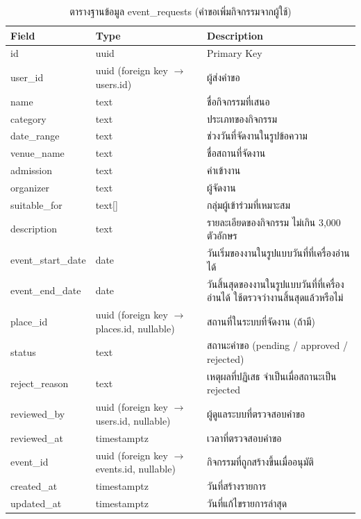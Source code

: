 \begin{table}[H]
\centering
\caption{ตารางฐานข้อมูล event\_requests (คำขอเพิ่มกิจกรรมจากผู้ใช้)}
\label{tab:db_eventrequests}
\begin{tabular}{|p{3.6cm}|p{2.6cm}|p{6.8cm}|}
\hline
\textbf{Field} & \textbf{Type} & \textbf{Description} \\
\hline
id & uuid & Primary Key \\ \hline
user\_id & uuid (foreign key $\to$ users.id) & ผู้ส่งคำขอ \\ \hline
name & text & ชื่อกิจกรรมที่เสนอ \\ \hline
category & text & ประเภทของกิจกรรม \\ \hline
date\_range & text & ช่วงวันที่จัดงานในรูปข้อความ \\ \hline
venue\_name & text & ชื่อสถานที่จัดงาน \\ \hline
admission & text & ค่าเข้างาน \\ \hline
organizer & text & ผู้จัดงาน \\ \hline
suitable\_for & text[] & กลุ่มผู้เข้าร่วมที่เหมาะสม \\ \hline
description & text & รายละเอียดของกิจกรรม ไม่เกิน 3,000 ตัวอักษร \\ \hline
event\_start\_date & date & วันเริ่มของงานในรูปแบบวันที่ที่เครื่องอ่านได้ \\ \hline
event\_end\_date & date & วันสิ้นสุดของงานในรูปแบบวันที่ที่เครื่องอ่านได้ ใช้ตรวจว่างานสิ้นสุดแล้วหรือไม่ \\ \hline
place\_id & uuid (foreign key $\to$ places.id, nullable) & สถานที่ในระบบที่จัดงาน (ถ้ามี) \\ \hline
status & text & สถานะคำขอ (pending / approved / rejected) \\ \hline
reject\_reason & text & เหตุผลที่ปฏิเสธ จำเป็นเมื่อสถานะเป็น rejected \\ \hline
reviewed\_by & uuid (foreign key $\to$ users.id, nullable) & ผู้ดูแลระบบที่ตรวจสอบคำขอ \\ \hline
reviewed\_at & timestamptz & เวลาที่ตรวจสอบคำขอ \\ \hline
event\_id & uuid (foreign key $\to$ events.id, nullable) & กิจกรรมที่ถูกสร้างขึ้นเมื่ออนุมัติ \\ \hline
created\_at & timestamptz & วันที่สร้างรายการ \\ \hline
updated\_at & timestamptz & วันที่แก้ไขรายการล่าสุด \\
\hline
\end{tabular}
\end{table}

